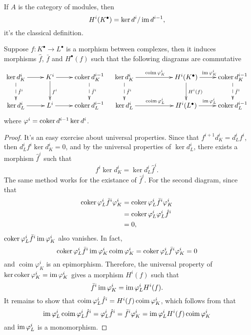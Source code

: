 If $A$ is the category of modules, then
\[
	H^i(K^\bullet)=\ker d^i/\operatorname{im} d^{i-1},
\]
it's the classical definition.

\begin{pro}
	Suppose $f:K^\bullet \to L^\bullet$ is a morphism between complexes,
	then it induces morphisms $\hat f$, $\bar f$ and $H^\bullet(f)$ 
	such that the following diagrams are commutative
	\[
		\xymatrix{
			\ker d_K^i\ar[r]\ar@{-->}[d]^{\hat{f}^i}&K^i\ar[r]
			\ar[d]^{f^i}&\coker d^{i-1}_K\ar@{-->}[d]^{\bar{f}^i}
			\\
			\ker d_L^i\ar[r]&L^i\ar[r]&\coker d^{i-1}_L
		}
		\quad 
		\xymatrix{
			\ker d_K^i\ar[rr]^{\coim \varphi^i_K}\ar@{-->}[d]^{\hat{f}^i}&&H^i(K^\bullet)\ar[r]^{\im\varphi^i_K}
			\ar[d]^{H^i(f)}&\coker d^{i-1}_K\ar@{-->}[d]^{\bar{f}^i}\\
			\ker d_L^i\ar[rr]^{\coim \varphi^i_L}&&H^i(L^\bullet)\ar[r]^{\im\varphi^i_L}&\coker d^{i-1}_L
		}
	\]
	where $\varphi^i=\operatorname{coker} d^{i-1}\ker d^i$.
\end{pro}

\begin{proof}
	It's an easy exercise about universal properties. Since that
	$f^{i+1}d_K^i=d_L^if^i$, then $d_L^if^i\ker d_K^i=0$, and by
	the universal properties of $\ker d_L^i$, there exists a 
	morphism $\hat{f}^i$ such that 
	\[
		f^i\ker d_K^i=\ker d_L^i\hat{f}^i.
	\]
	The same method works for the existance of $\bar f^i$. 
	For the second diagram, since that
	\[
	\begin{aligned}
		\operatorname{coker} \varphi^i_L \bar f^i \varphi^i_K
		&= \operatorname{coker} \varphi^i_L \bar f^i \varphi^i_K\\
		&= \operatorname{coker} \varphi^i_L \varphi^i_L \hat f^i \\
		&= 0,
	\end{aligned}
	\]
	$\operatorname{coker} \varphi^i_L \bar f^i \operatorname{im} \varphi^i_K$ also vanishes. In fact,
	\[
		\operatorname{coker} \varphi^i_L \bar f^i \operatorname{im} \varphi^i_K\operatorname{coim}\varphi^i_K=\operatorname{coker} \varphi^i_L \bar f^i \varphi^i_K=0
	\]
	and $\operatorname{coim}\varphi^i_K$ is an epimorphism.
	Therefore, the universal property of 
	$\ker \operatorname{coker} \varphi_K^i=\operatorname{im} \varphi_K^i$ gives a
	morphism $H^i(f)$ such that
	\[
		\bar f^i \operatorname{im} \varphi^i_K=\operatorname{im} \varphi_L^i H^i(f).
	\]
	It remains to show that $\operatorname{coim} \varphi_L^i\hat f^i= H^i(f)\operatorname{coim} \varphi_K^i$, which follows from that
	\[
		\operatorname{im} \varphi_L^i\operatorname{coim} \varphi_L^i\hat f^i=\varphi^i_L\hat f^i=\bar f^i \varphi^i_K=
		\operatorname{im} \varphi_L^i H^i(f)\operatorname{coim} \varphi^i_K
	\]
	and $\operatorname{im} \varphi_L^i$ is a monomorphism.
\end{proof}

